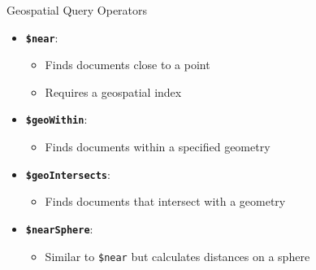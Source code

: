 \documentclass{beamer}
\begin{document}
\begin{frame}{Geospatial Query Operators}
  \begin{itemize}
    \item \textbf{\texttt{\$near}}:
      \begin{itemize}
        \item Finds documents close to a point
        \item Requires a geospatial index
      \end{itemize}
    \item \textbf{\texttt{\$geoWithin}}:
      \begin{itemize}
        \item Finds documents within a specified geometry
      \end{itemize}
    \item \textbf{\texttt{\$geoIntersects}}:
      \begin{itemize}
        \item Finds documents that intersect with a geometry
      \end{itemize}
    \item \textbf{\texttt{\$nearSphere}}:
      \begin{itemize}
        \item Similar to \texttt{\$near} but calculates distances on a sphere
      \end{itemize}
  \end{itemize}
\end{frame}

\end{document}
